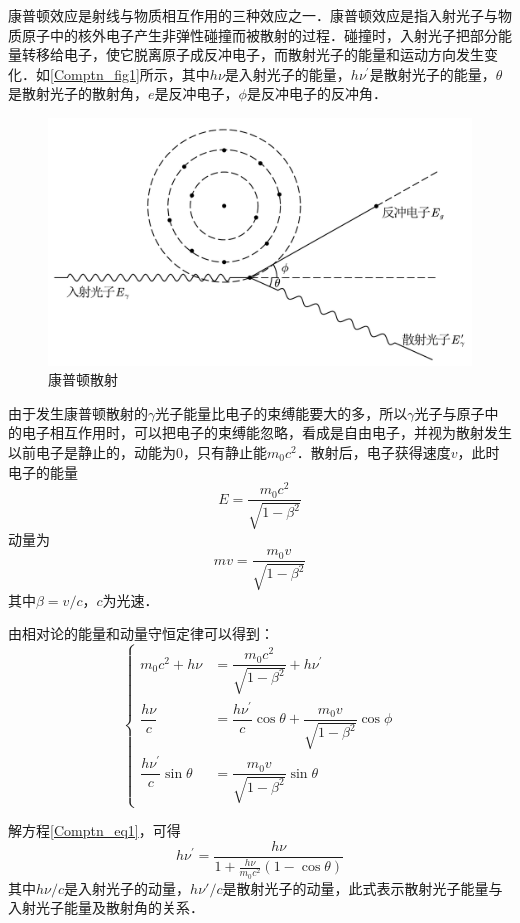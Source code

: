 
康普顿效应是射线与物质相互作用的三种效应之一．康普顿效应是指入射光子与物质原子中的核外电子产生非弹性碰撞而被散射的过程．碰撞时，入射光子把部分能量转移给电子，使它脱离原子成反冲电子，而散射光子的能量和运动方向发生变化．如\autoref{Comptn_fig1}所示，其中$h\nu$是入射光子的能量，$h\nu^\prime$是散射光子的能量，$\theta$是散射光子的散射角，$e$是反冲电子，$\phi$是反冲电子的反冲角．
\begin{figure}[ht]
\centering
\includegraphics[width=11.5cm]{./figures/Comptn_1.pdf}
\caption{康普顿散射} \label{Comptn_fig1}
\end{figure}
由于发生康普顿散射的$\gamma$光子能量比电子的束缚能要大的多，所以$\gamma$光子与原子中的电子相互作用时，可以把电子的束缚能忽略，看成是自由电子，并视为散射发生以前电子是静止的，动能为$0$，只有静止能$m_0c^2$．散射后，电子获得速度$v$，此时电子的能量
\begin{equation}
E=\frac{m_{0} c^{2}}{\sqrt{1-\beta^{2}}}
\end{equation}
动量为
\begin{equation}
m v=\frac{m_{0} v}{\sqrt{1-\beta^{2}}}
\end{equation}
其中$\beta=v/c$，$c$为光速．

由相对论的能量和动量守恒定律可以得到：
\begin{equation} \label{Comptn_eq1}
\begin{cases}
m_{0} c^{2}+h \nu&=\dfrac{m_{0} c^{2}}{\sqrt{1-\beta^{2}}}+h \nu^{\prime} \\
\dfrac{h \nu}{c}&=\dfrac{h \nu^{\prime}}{c} \cos \theta+\dfrac{m_{0} v}{\sqrt{1-\beta^{2}}} \cos \phi \\
\dfrac{h \nu^{\prime}}{c} \sin \theta&=\dfrac{m_{0} v}{\sqrt{1-\beta^{2}}} \sin \theta
\end{cases}
\end{equation}

解方程\autoref{Comptn_eq1}，可得
\begin{equation}
h \nu^{\prime}=\frac{h \nu}{1+\frac{h \nu}{m_{0} c^{2}}(1-\cos \theta)}
\end{equation}
其中$h\nu / c$是入射光子的动量，$h\nu' / c$是散射光子的动量，此式表示散射光子能量与入射光子能量及散射角的关系．